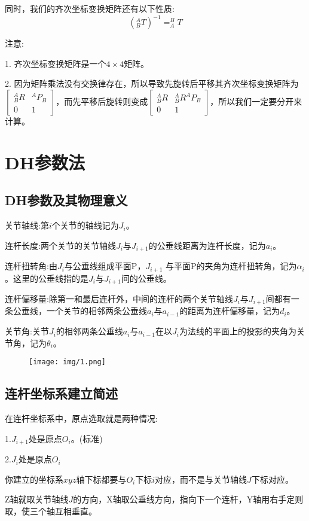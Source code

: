 \documentclass[12pt, a4paper, oneside]{ctexbook}
\begin{document}
同时，我们的齐次坐标变换矩阵还有以下性质:
$$
(^{A}_{B}T)^{-1}=^{B}_{A}T
$$

注意:

1. 齐次坐标变换矩阵是一个$4\times4$矩阵。

2. 因为矩阵乘法没有交换律存在，所以导致先旋转后平移其齐次坐标变换矩阵为$\left[
\begin{matrix}
	^{A}_{B}R & ^{A}P_B\\
	0 & 1
\end{matrix}
\right]$，而先平移后旋转则变成$\left[
\begin{matrix}
	^{A}_{B}R & ^{A}_{B}R^{A}P_B\\
	0 & 1
\end{matrix}
\right]$，所以我们一定要分开来计算。
\section{DH参数法}
\subsection{DH参数及其物理意义}
关节轴线:第$i$个关节的轴线记为$J_i$。

连杆长度:两个关节的关节轴线$J_i$与$J_{i+1}$的公垂线距离为连杆长度，记为$a_i$。

连杆扭转角:由$J_i$与公垂线组成平面P，$J_{i+1}$ 与平面P的夹角为连杆扭转角，记为$ \alpha_i$。这里的公垂线指的是$J_i$与$J_{i+1}$间的公垂线。

连杆偏移量:除第一和最后连杆外，中间的连杆的两个关节轴线$J_i$与$J_{i+1}$间都有一条公垂线，一个关节的相邻两条公垂线$a_i$与$a_{i-1}$的距离为连杆偏移量，记为$d_i$。

关节角:关节$J_i的$相邻两条公垂线$a_i$与$a_{i-1}$在以$J_i$为法线的平面上的投影的夹角为关节角，记为$\theta_i$。
\begin{figure}[htbp]
	\centering
	\texttt{[image: img/1.png]}
\end{figure}
\newpage
\subsection{连杆坐标系建立简述}
在连杆坐标系中，原点选取就是两种情况:

1.$J_{i+1}$处是原点$O_i$。(标准)

2.$J_{i}$处是原点$O_i$

你建立的坐标系$xyz$轴下标都要与$O_i$下标$i$对应，而不是与关节轴线$J$下标对应。

Z轴就取关节轴线$J$的方向，X轴取公垂线方向，指向下一个连杆，Y轴用右手定则取，使三个轴互相垂直。
\end{document}
